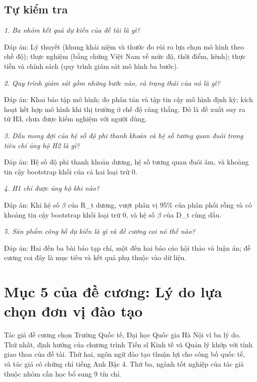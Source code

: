\section{Tự kiểm tra}

{\itshape 1. Ba nhóm kết quả dự kiến của đề tài là gì?\par}

Đáp án: Lý thuyết (khung khái niệm và thước đo rủi ro lựa chọn mô hình theo chế độ); thực nghiệm (bằng chứng Việt Nam về mức độ, thời điểm, kênh); thực tiễn và chính sách (quy trình giám sát mô hình ba bước).

{\itshape 2. Quy trình giám sát gồm những bước nào, và trạng thái của nó là gì?\par}

Đáp án: Khai báo tập mô hình; đo phân tán và tập tin cậy mô hình định kỳ; kích hoạt kết hợp mô hình khi thị trường ở chế độ căng thẳng. Đó là đề xuất suy ra từ H3, chưa được kiểm nghiệm với người dùng.

{\itshape 3. Dấu mong đợi của hệ số độ phi thanh khoản và hệ số tương quan đuôi trong tiêu chí ủng hộ H2 là gì?\par}

Đáp án: Hệ số độ phi thanh khoản dương, hệ số tương quan đuôi âm, và khoảng tin cậy bootstrap khối của cả hai loại trừ 0.

{\itshape 4. H1 chỉ được ủng hộ khi nào?\par}

Đáp án: Khi hệ số \texorpdfstring{$\beta$}{beta} của R\_t dương, vượt phân vị 95\% của phân phối rỗng và có khoảng tin cậy bootstrap khối loại trừ 0, và hệ số \texorpdfstring{$\beta$}{beta} của D\_t cùng dấu.

{\itshape 5. Sản phẩm công bố dự kiến là gì và đề cương coi nó thế nào?\par}

Đáp án: Hai đến ba bài báo tạp chí, một đến hai báo cáo hội thảo và luận án; đề cương coi đây là mục tiêu và kết quả phụ thuộc vào dữ liệu.

\chapter{Mục 5 của đề cương: Lý do lựa chọn đơn vị đào tạo}

Tác giả đề cương chọn Trường Quốc tế, Đại học Quốc gia Hà Nội vì ba lý do. Thứ nhất, định hướng của chương trình Tiến sĩ Kinh tế và Quản lý khớp với tính giao thoa của đề tài. Thứ hai, ngôn ngữ đào tạo thuận lợi cho công bố quốc tế, và tác giả có chứng chỉ tiếng Anh Bậc 4. Thứ ba, ngành tốt nghiệp của tác giả thuộc nhóm cần học bổ sung 9 tín chỉ.

